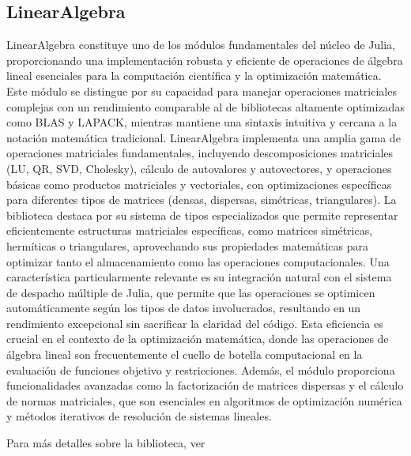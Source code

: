 \subsection*{LinearAlgebra}
LinearAlgebra constituye uno de los módulos fundamentales del núcleo de Julia, 
proporcionando una implementación robusta y eficiente de operaciones de álgebra 
lineal esenciales para la computación científica y la optimización matemática. 
Este módulo se distingue por su capacidad para manejar operaciones matriciales 
complejas con un rendimiento comparable al de bibliotecas altamente optimizadas 
como BLAS y LAPACK, mientras mantiene una sintaxis intuitiva y cercana a la 
notación matemática tradicional. LinearAlgebra implementa una amplia gama de 
operaciones matriciales fundamentales, 
incluyendo descomposiciones matriciales (LU, QR, SVD, Cholesky), 
cálculo de autovalores y autovectores, y operaciones 
básicas como productos matriciales y vectoriales, 
con optimizaciones específicas para diferentes tipos de matrices 
(densas, dispersas, simétricas, triangulares). 
La biblioteca destaca por su sistema de tipos especializados 
que permite representar eficientemente estructuras matriciales específicas, 
como matrices simétricas, hermíticas o triangulares, aprovechando sus 
propiedades matemáticas para optimizar tanto el almacenamiento como las 
operaciones computacionales. Una característica particularmente relevante 
es su integración natural con el sistema de despacho múltiple de Julia, 
que permite que las operaciones se optimicen automáticamente según los 
tipos de datos involucrados, resultando en un rendimiento excepcional sin 
sacrificar la claridad del código. Esta eficiencia es crucial en el contexto 
de la optimización matemática, donde las operaciones de álgebra lineal son 
frecuentemente el cuello de botella computacional en la evaluación de funciones 
objetivo y restricciones. Además, el módulo proporciona funcionalidades 
avanzadas como la factorización de matrices dispersas y el cálculo de normas 
matriciales, que son esenciales en algoritmos de optimización numérica y 
métodos iterativos de resolución de sistemas lineales.

Para más detalles sobre la biblioteca, ver \cite{LinearAlgebraJL}
